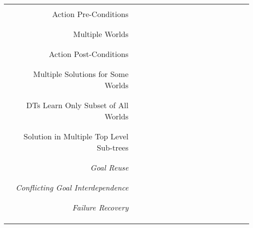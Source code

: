 \documentclass[landscape,a4paper,title page]{article}
\newcommand{\x}{{\checked}}
\begin{document}
\begin{table}[!htb]
\begin{tabular}{ r | c  c  c  c  c  c  c  c  c  c  c  c  c  c  c }
  \\ \hline \\
  Action Pre-Conditions & \x & \x & \x & \x & \x & \x & \x & \x & \x & \x & \x & \x & \x & \x \\
  \\ \hline \\
  Multiple Worlds &   &   &   &   &   & \x & \x & \x & \x & \x & \x & \x & \x & \x \\
  \\ \hline \\
  Action Post-Conditions &   &   &   &   &   & \x & \x & \x & \x & \x &   & \x & \x & \x \\
  \\ \hline \\
  Multiple Solutions for Some Worlds &   &   &   &   &   & \x & \x & \x & \x & \x &   &   & \x & \x \\
  \\ \hline \\
  DTs Learn Only Subset of All Worlds &   &   &   &   &   & \x & \x & \x & \x & \x &   &   & \x & \x \\
  \\ \hline \\
  Solution in Multiple Top Level Sub-trees &   &   &   &   &   &   &   &   &   &   &   & \x & \x & \x  \\
  \\ \hline \\
  \textit{Goal Reuse} &   &   &   &   &   &   &   &   &   &   &   &   &   &   \\
  \\ \hline \\
  \textit{Conflicting Goal Interdependence} &   &   &   &   &   &   &   &   &   &   &   &   &   &   \\
  \\ \hline \\
  \textit{Failure Recovery} &   &   &   &   &   &   &   &   &   &   &   &   &   &   \\
  \\ \hline \\ \\
  \end{tabular}
  \label{tab:perofrmanceFactors}
\end{table}
\end{document}
